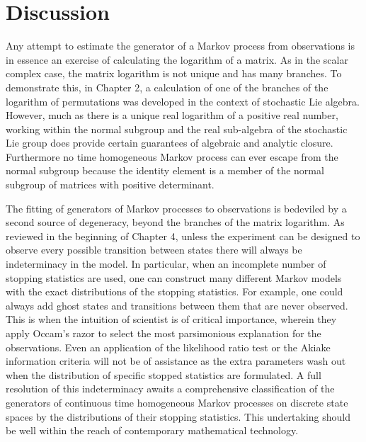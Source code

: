 \section{Discussion}
Any attempt to estimate the generator of a Markov process from observations is in essence an 
exercise of calculating the logarithm of a matrix. As in the scalar complex case, the matrix 
logarithm is not unique and has many branches. To demonstrate this, in Chapter 2, a 
calculation of one of the branches of the logarithm of permutations was developed in the
context of stochastic Lie algebra. However, much as there is a unique real logarithm of a 
positive real number, working within the normal subgroup and the real sub-algebra of the 
stochastic Lie group does provide certain guarantees of algebraic and analytic closure. 
Furthermore no time homogeneous Markov process can ever escape from the normal subgroup 
because the identity element is a member of the normal subgroup of matrices with positive 
determinant.

The fitting of generators of Markov processes to observations is bedeviled by a second
source of degeneracy, beyond the branches of the matrix logarithm. As reviewed in the 
beginning of Chapter 4, unless the experiment can be designed to observe every possible 
transition between states there will always be indeterminacy in the model. In particular, 
when an incomplete number of stopping statistics are used, one can construct many different Markov models with 
the exact distributions of the stopping statistics. For example, one could always add 
ghost states and transitions between them that are never observed. This is when the 
intuition of scientist is of critical importance, wherein they apply Occam's razor to 
select the most parsimonious explanation for the observations. Even an application of the 
likelihood ratio test or the Akiake information criteria \cite{akaike_new_1974} will not be 
of assistance as the extra parameters wash out when the distribution of specific stopped
statistics are formulated. A full resolution of this indeterminacy awaits a comprehensive
classification of the generators of continuous time homogeneous Markov processes on discrete
state spaces by the distributions of their stopping statistics. This undertaking should be
well within the reach of contemporary mathematical technology.

